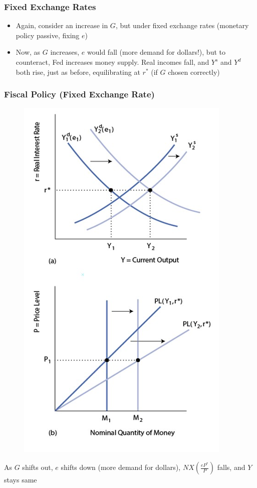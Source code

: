 \documentclass{beamer}
\begin{document}
\begin{frame}
\frametitle[alignment=center]{Fixed Exchange Rates}
\begin{itemize}
\item Again, consider an increase in $G$, but under fixed exchange rates (monetary policy passive, fixing $e$)
\bigskip
\item Now, as $G$ increases, $e$ would fall (more demand for dollars!), but to counteract, Fed increases money supply.  Real incomes fall, and $Y^s$ and $Y^d$ both rise, just as before, equilibrating at $r^*$ (if $G$ chosen correctly)
\end{itemize}
\end{frame}


\begin{frame}
\frametitle[alignment=center]{Fiscal  Policy (Fixed Exchange Rate)}
\begin{figure}
\centering
\includegraphics[scale=0.55]{Figures/W_Fig_17pt16.png}
\end{figure}
As $G$ shifts out, $e$ shifts down (more demand for dollars), $NX\left(\frac{eP^*}{P}\right)$ falls, and $Y$ stays same
\end{frame}
\end{document}
